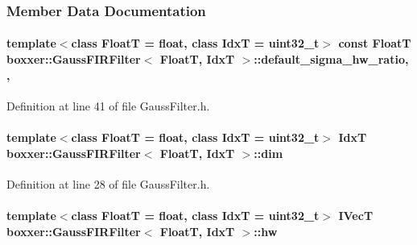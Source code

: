 \subsubsection{Member Data Documentation}
\paragraph[{\texorpdfstring{default\+\_\+sigma\+\_\+hw\+\_\+ratio}{default_sigma_hw_ratio}}]{\setlength{\rightskip}{0pt plus 5cm}template$<$class FloatT = float, class IdxT = uint32\+\_\+t$>$ const FloatT {\bf boxxer\+::\+Gauss\+F\+I\+R\+Filter}$<$ FloatT, IdxT $>$\+::default\+\_\+sigma\+\_\+hw\+\_\+ratio\hspace{0.3cm}{\ttfamily [static]}, {\ttfamily [protected]}, {\ttfamily [inherited]}}\hypertarget{classboxxer_1_1GaussFIRFilter_a72b51cd7549510735179cb9c94f5f43f}{}\label{classboxxer_1_1GaussFIRFilter_a72b51cd7549510735179cb9c94f5f43f}


Definition at line 41 of file Gauss\+Filter.\+h.

\paragraph[{\texorpdfstring{dim}{dim}}]{\setlength{\rightskip}{0pt plus 5cm}template$<$class FloatT = float, class IdxT = uint32\+\_\+t$>$ IdxT {\bf boxxer\+::\+Gauss\+F\+I\+R\+Filter}$<$ FloatT, IdxT $>$\+::dim\hspace{0.3cm}{\ttfamily [inherited]}}\hypertarget{classboxxer_1_1GaussFIRFilter_ac7adcd4d8f8efee00a65262f596c8eda}{}\label{classboxxer_1_1GaussFIRFilter_ac7adcd4d8f8efee00a65262f596c8eda}


Definition at line 28 of file Gauss\+Filter.\+h.

\paragraph[{\texorpdfstring{hw}{hw}}]{\setlength{\rightskip}{0pt plus 5cm}template$<$class FloatT = float, class IdxT = uint32\+\_\+t$>$ {\bf I\+VecT} {\bf boxxer\+::\+Gauss\+F\+I\+R\+Filter}$<$ FloatT, IdxT $>$\+::hw\hspace{0.3cm}{\ttfamily [inherited]}}\hypertarget{classboxxer_1_1GaussFIRFilter_ae17a4e137303e452a9223ba34825e0da}{}\label{classboxxer_1_1GaussFIRFilter_ae17a4e137303e452a9223ba34825e0da}


